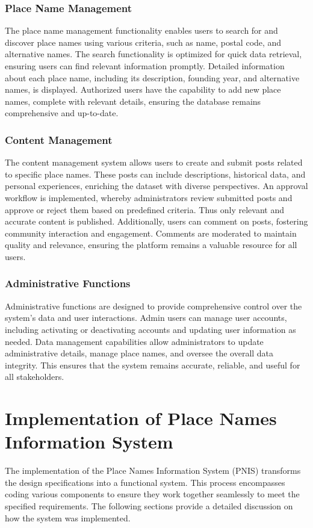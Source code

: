 \subsubsection{Place Name Management}
The place name management functionality enables users to search for and discover place names using various criteria, such as name, postal code, and alternative names. The search functionality is optimized for quick data retrieval, ensuring users can find relevant information promptly. Detailed information about each place name, including its description, founding year, and alternative names, is displayed. Authorized users have the capability to add new place names, complete with relevant details, ensuring the database remains comprehensive and up-to-date.

\subsubsection{Content Management}
The content management system allows users to create and submit posts related to specific place names. These posts can include descriptions, historical data, and personal experiences, enriching the dataset with diverse perspectives. An approval workflow is implemented, whereby administrators review submitted posts and approve or reject them based on predefined criteria. Thus only relevant and accurate content is published. Additionally, users can comment on posts, fostering community interaction and engagement. Comments are moderated to maintain quality and relevance, ensuring the platform remains a valuable resource for all users.

\subsubsection{Administrative Functions}
Administrative functions are designed to provide comprehensive control over the system's data and user interactions. Admin users can manage user accounts, including activating or deactivating accounts and updating user information as needed. Data management capabilities allow administrators to update administrative details, manage place names, and oversee the overall data integrity. This ensures that the system remains accurate, reliable, and useful for all stakeholders.


\section{Implementation of Place Names Information System}
The implementation of the Place Names Information System (PNIS) transforms the design specifications into a functional system. This process encompasses coding various components to ensure they work together seamlessly to meet the specified requirements. The following sections provide a detailed discussion on how the system was implemented.


